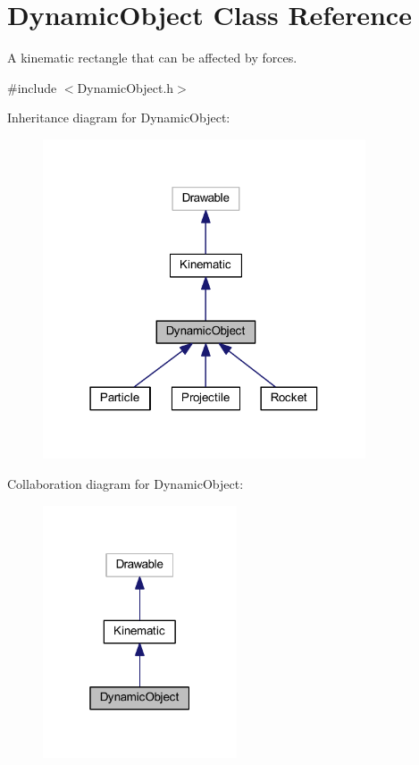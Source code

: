 \hypertarget{class_dynamic_object}{}\section{Dynamic\+Object Class Reference}
\label{class_dynamic_object}


A kinematic rectangle that can be affected by forces.  




{\ttfamily \#include $<$Dynamic\+Object.\+h$>$}



Inheritance diagram for Dynamic\+Object\+:\nopagebreak
\begin{figure}[H]
\begin{center}
\leavevmode
\includegraphics[width=271pt]{class_dynamic_object__inherit__graph}
\end{center}
\end{figure}


Collaboration diagram for Dynamic\+Object\+:\nopagebreak
\begin{figure}[H]
\begin{center}
\leavevmode
\includegraphics[width=163pt]{class_dynamic_object__coll__graph}
\end{center}
\end{figure}
